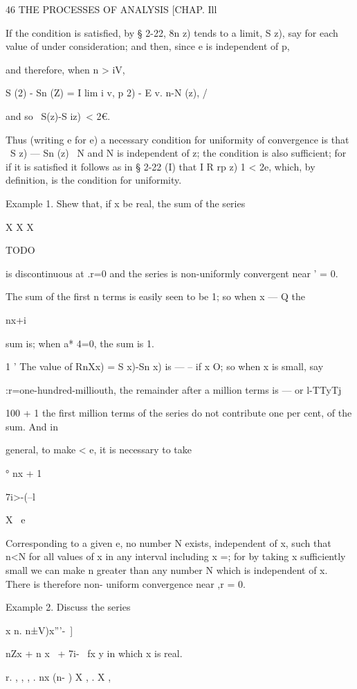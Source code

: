 46 THE PROCESSES OF ANALYSIS [CHAP. Ill

If the condition is satisfied, by § 2-22, 8n z) tends to a limit, S
z), say for each value of under consideration; and then, since e is
independent of p,

and therefore, when n > iV,

S (2) - Sn (Z) = I lim i v, p 2) - E v. n-N (z), /

and so \ S(z)-S iz)\ < 2€.

Thus (writing e for e) a necessary condition for uniformity of
convergence is that \ S z) — Sn (z) \ < e, whenever n>N and N is
independent of z; the condition is also sufficient; for if it is
satisfied it follows as in § 2-22 (I) that I R rp z) 1 < 2e, which, by
definition, is the condition for uniformity.

Example 1. Shew that, if x be real, the sum of the series

X X X

TODO

is discontinuous at .r=0 and the series is non-uniformly convergent
near ' = 0.

The sum of the first n terms is easily seen to be 1; so when x — Q
the

nx+i

sum is; when a* 4=0, the sum is 1.

1 ' The value of RnXx) = S x)-Sn x) is — -- if x O; so when x is
small, say

:r=one-hundred-milliouth, the remainder after a million terms is — or
l-TTyTj

100 + 1 the first million terms of the series do not contribute one
per cent, of the sum. And in

general, to make < e, it is necessary to take

° nx + 1

7i>-(--l

X \ e

Corresponding to a given e, no number N exists, independent of x, such
that n<N for all values of x in any interval including x =; for by
taking x sufficiently small we can make n greater than any number N
which is independent of x. There is therefore non- uniform convergence
near ,r = 0.

Example 2. Discuss the series

x n. n±V)x'''-\ ]



nZx + n x \ + 7i- \ fx y in which x is real.

r. , , , . nx (n- ) X , . X ,

